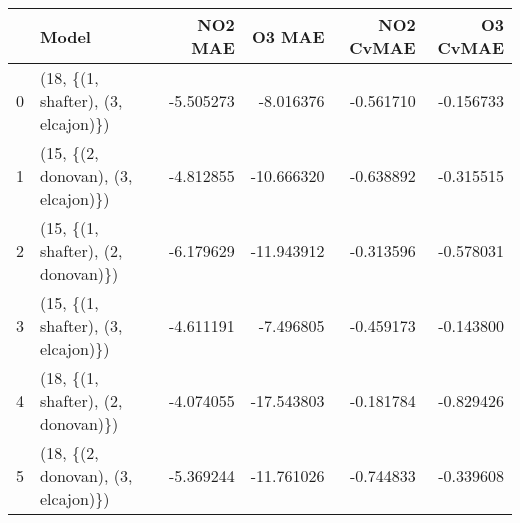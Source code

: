 \begin{tabular}{llrrrr}
\toprule
{} &                               Model &   NO2 MAE &     O3 MAE &  NO2 CvMAE &  O3 CvMAE \\
\midrule
0 &  (18, \{(1, shafter), (3, elcajon)\}) & -5.505273 &  -8.016376 &  -0.561710 & -0.156733 \\
1 &  (15, \{(2, donovan), (3, elcajon)\}) & -4.812855 & -10.666320 &  -0.638892 & -0.315515 \\
2 &  (15, \{(1, shafter), (2, donovan)\}) & -6.179629 & -11.943912 &  -0.313596 & -0.578031 \\
3 &  (15, \{(1, shafter), (3, elcajon)\}) & -4.611191 &  -7.496805 &  -0.459173 & -0.143800 \\
4 &  (18, \{(1, shafter), (2, donovan)\}) & -4.074055 & -17.543803 &  -0.181784 & -0.829426 \\
5 &  (18, \{(2, donovan), (3, elcajon)\}) & -5.369244 & -11.761026 &  -0.744833 & -0.339608 \\
\bottomrule
\end{tabular}
